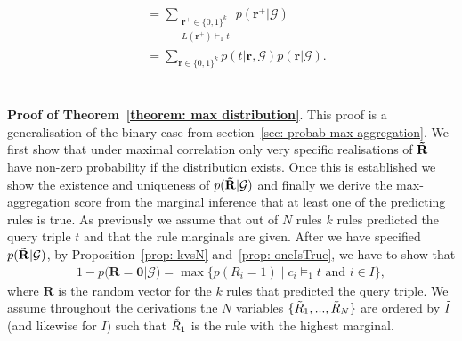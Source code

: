 \documentclass{article}
\theoremstyle{plain}
\theoremstyle{remark}
\newcommand{\atomrule}{c}
\newcommand{\vecallfiredrules}{\mathbf{r}}
\newcommand{\randomvecallrules}{\mathbf{\Tilde{R}}}
\newcommand{\onerulRV}{\Tilde{R}}
\newcommand{\oneFiredrulRV}{R}
\newcommand{\alltriples}{\mathcal{G}}
\newcommand{\indexSetAll}{\Tilde{I}}
\newcommand{\indexSetFired}{I}
\begin{document}
\begin{align*}
    &= \sum\limits_{\substack{ \vecallfiredrules^+ \in \{0, 1\}^k \\ L(\vecallfiredrules^+) \models_1 t}} 
     p(\vecallfiredrules^+ | \alltriples) \\
     &=\sum_{\vecallfiredrules\in \{0, 1\}^k}  p(t |\vecallfiredrules, \alltriples) p(\vecallfiredrules | \alltriples) . \tag*{\qed}
\end{align*}
  \\
 \\
\noindent \textbf{Proof of Theorem~\ref{theorem: max distribution}}.
This proof is a generalisation of the binary case from section~\ref{sec: probab max aggregation}. We first show that under maximal correlation only very specific realisations of $\randomvecallrules$ have non-zero probability if the distribution exists. Once this is established we show the existence and uniqueness of $p(\randomvecallrules | \alltriples)$ and finally we derive the max-aggregation score from the marginal inference that at least one of the predicting rules is true.
As previously we assume that out of $N$ rules $k$ rules predicted the query triple $t$ and that the rule marginals are given. After we have specified $p(\randomvecallrules | \alltriples)$, by Proposition~\ref{prop: kvsN} and~\ref{prop: oneIsTrue}, we have to show that
\begin{align}
   1 - p(\mathbf{R}=\mathbf{0} | \alltriples) = \max \big\{p(\oneFiredrulRV_i=1) \; | \; \atomrule_i \models_1 t \textrm{ and } i \in \indexSetFired  \big\}, \label{eq: main-result-max}
\end{align}
where $\mathbf{R}$ is the random vector for the $k$ rules that predicted the query triple. We assume throughout the derivations the $N$ variables $\{\onerulRV_1, ..., \onerulRV_N \}$ are ordered by $\indexSetAll$ (and likewise for $\indexSetFired$) such that $\onerulRV_1$ is the rule with the highest marginal.
\end{document}
